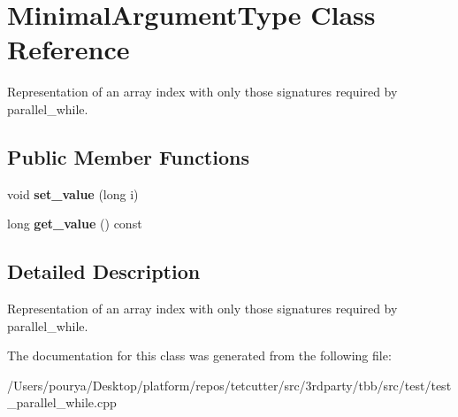 \hypertarget{classMinimalArgumentType}{}\section{Minimal\+Argument\+Type Class Reference}
\label{classMinimalArgumentType}


Representation of an array index with only those signatures required by parallel\+\_\+while.  


\subsection*{Public Member Functions}
\begin{DoxyCompactItemize}
\item 
\hypertarget{classMinimalArgumentType_ac57e881138e5b334e73f046d8aad32a5}{}void {\bfseries set\+\_\+value} (long i)\label{classMinimalArgumentType_ac57e881138e5b334e73f046d8aad32a5}

\item 
\hypertarget{classMinimalArgumentType_a39e86f3e65267382aba75427b87c5210}{}long {\bfseries get\+\_\+value} () const \label{classMinimalArgumentType_a39e86f3e65267382aba75427b87c5210}

\end{DoxyCompactItemize}


\subsection{Detailed Description}
Representation of an array index with only those signatures required by parallel\+\_\+while. 

The documentation for this class was generated from the following file\+:\begin{DoxyCompactItemize}
\item 
/\+Users/pourya/\+Desktop/platform/repos/tetcutter/src/3rdparty/tbb/src/test/test\+\_\+parallel\+\_\+while.\+cpp\end{DoxyCompactItemize}

